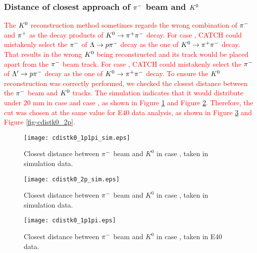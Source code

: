 \subsubsection{Distance of closest approach of $\pi^{-}$ beam and $K^{0}$}
\textcolor{red}{ The $K^{0}$ reconstruction method sometimes regards the wrong combination of $\pi^{-}$ and $\pi^{+}$ as the decay products of $K^0 \to \pi^+ \pi^-$ decay. For case , CATCH could mistakenly select the $\pi^{-}$ of $\Lambda\to p\pi^{-}$ decay as the one of $K^0 \to \pi^+ \pi^-$ decay. That results in the wrong $K^{0}$ being reconstructed and its track would be placed apart from the $\pi^{-}$ beam track. For case , CATCH could mistakenly select the $\pi^{-}$ of $\Lambda'\to p\pi^{-}$ decay as the one of $K^0 \to \pi^+ \pi^-$ decay. 
To ensure the $K^{0}$ reconstruction was correctly performed, we checked the closest distance between the $\pi^{-}$ beam and $K^{0}$ tracks. The simulation indicates that it would distribute under 20 mm in case  and case , as shown in Figure \ref{fig-cdistk0_1p1pi_sim} and Figure \ref{fig-cdistk0_2p_sim}. Therefore, the cut was chosen at the same value for E40 data analysis, as shown in Figure \ref{fig-cdistk0_1p1pi} and Figure \ref{fig-cdistk0_2p}. }



\begin{figure}[!h]
  \begin{center}
    \texttt{[image: cdistk0\_1p1pi\_sim.eps]}
    \caption{Closest distance between $\pi^{-}$ beam and $K^{0}$ in case , taken in simulation data.}
    \label{fig-cdistk0_1p1pi_sim}
  \end{center}
\end{figure}

\begin{figure}[!h]
  \begin{center}
    \texttt{[image: cdistk0\_2p\_sim.eps]}
    \caption{Closest distance between $\pi^{-}$ beam and $K^{0}$ in case , taken in simulation data.}
    \label{fig-cdistk0_2p_sim}
  \end{center}
\end{figure}

\begin{figure}[!h]
  \begin{center}
    \texttt{[image: cdistk0\_1p1pi.eps]}
    \caption{Closest distance between $\pi^{-}$ beam and $K^{0}$ in case , taken in E40 data.}
    \label{fig-cdistk0_1p1pi}
  \end{center}
\end{figure}

